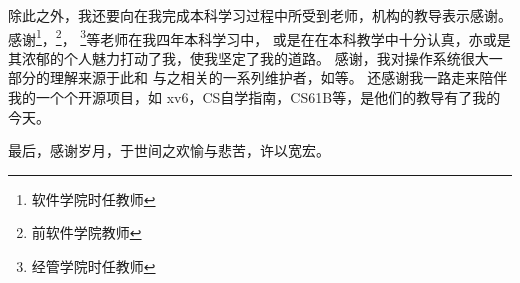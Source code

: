 除此之外，我还要向在我完成本科学习过程中所受到老师，机构的教导表示感谢。
感谢\footnote{软件学院时任教师}，\footnote{前软件学院教师}，
\footnote{经管学院时任教师}等老师在我四年本科学习中，
或是在在本科教学中十分认真，亦或是其浓郁的个人魅力打动了我，使我坚定了我的道路。
感谢，我对操作系统很大一部分的理解来源于此和
与之相关的一系列维护者，如等。
还感谢我一路走来陪伴我的一个个开源项目，如 xv6，CS自学指南，CS61B等，是他们的教导有了我的今天。

最后，感谢岁月，于世间之欢愉与悲苦，许以宽宏。

